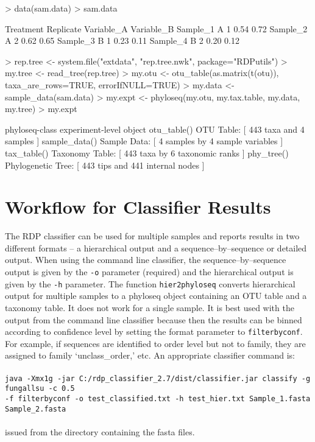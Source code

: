 \documentclass{article}
\begin{document}
\begin{Schunk}
\begin{Sinput}
> data(sam.data)
> sam.data
\end{Sinput}
\begin{Soutput}
         Treatment Replicate Variable_A Variable_B
Sample_1         A         1       0.54       0.72
Sample_2         A         2       0.62       0.65
Sample_3         B         1       0.23       0.11
Sample_4         B         2       0.20       0.12
\end{Soutput}
\begin{Sinput}
> rep.tree <- system.file("extdata", "rep.tree.nwk", package="RDPutils")
> my.tree <- read_tree(rep.tree)
> my.otu <- otu_table(as.matrix(t(otu)), taxa_are_rows=TRUE, errorIfNULL=TRUE)
> my.data <- sample_data(sam.data)
> my.expt <- phyloseq(my.otu, my.tax.table, my.data, my.tree)
> my.expt
\end{Sinput}
\begin{Soutput}
phyloseq-class experiment-level object
otu_table()   OTU Table:         [ 443 taxa and 4 samples ]
sample_data() Sample Data:       [ 4 samples by 4 sample variables ]
tax_table()   Taxonomy Table:    [ 443 taxa by 6 taxonomic ranks ]
phy_tree()    Phylogenetic Tree: [ 443 tips and 441 internal nodes ]
\end{Soutput}
\end{Schunk}
\section*{Workflow for Classifier Results}
The RDP classifier can be used for multiple samples and  reports results in two different formats -- a hierarchical output and a sequence--by--sequence  or detailed output.  When using the command line classifier, the sequence--by--sequence output is given by the \texttt{-o} parameter (required) and the hierarchical output is given by the \texttt{-h} parameter.  The function \texttt{hier2phyloseq} converts hierarchical output for multiple samples to a phyloseq object containing an OTU table and a taxonomy table.  It does not work for a single sample.  It is best used with the output from the command line classifier because then the results can be binned according to confidence level by setting the format parameter to  \texttt{filterbyconf}.  For example, if sequences are identified to order level but not to family, they are assigned to family `unclass\_order,' etc.  An appropriate classifier command is:\\ \\
\texttt{java -Xmx1g -jar C:/rdp\_classifier\_2.7/dist/classifier.jar classify -g fungallsu -c 0.5 \\-f filterbyconf -o test\_classified.txt -h test\_hier.txt Sample\_1.fasta Sample\_2.fasta}\\ \\issued from the directory containing the fasta files.
\end{document}
